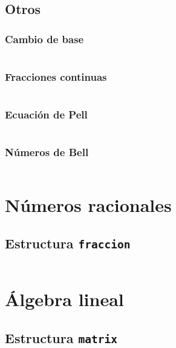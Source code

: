 \documentclass[11pt]{article}
\begin{document}
		\subsection{Otros}
			\subsubsection{Cambio de base}
			\inputminted[tabsize=2,breaklines,firstline=442,lastline=462,fontsize=\small]{c++}{numberTheory.cpp}
			
			\subsubsection{Fracciones continuas}
			\inputminted[tabsize=2,breaklines,firstline=598,lastline=640,fontsize=\small]{c++}{numberTheory.cpp}
			
			\subsubsection{Ecuación de Pell}
			\inputminted[tabsize=2,breaklines,firstline=642,lastline=655,fontsize=\small]{c++}{numberTheory.cpp}
			
			\subsubsection{Números de Bell}
			\inputminted[tabsize=2,breaklines,firstline=898,lastline=910,fontsize=\small]{c++}{numberTheory.cpp}
			
	\newpage
	\section{Números racionales}
		\subsection{Estructura \texttt{fraccion}}
		\inputminted[tabsize=2,breaklines,firstline=7,lastline=123,fontsize=\small]{c++}{fraccion.cpp}
		
	\newpage
	\section{Álgebra lineal}
		\subsection{Estructura \texttt{matrix}}
		\inputminted[tabsize=2,breaklines,firstline=9,lastline=33,fontsize=\small]{c++}{matrix.cpp}
		\inputminted[tabsize=2,breaklines,firstline=122,lastline=227,fontsize=\small]{c++}{matrix.cpp}
		
\end{document}
